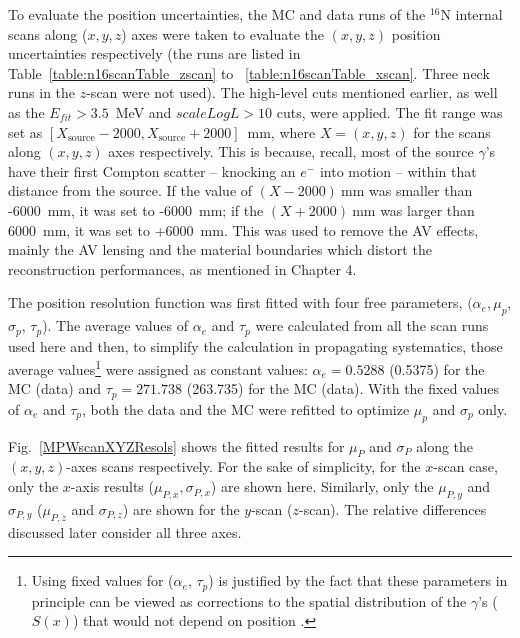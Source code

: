 To evaluate the position uncertainties, the MC and data runs of the $^{16}$N internal scans along ($x, y, z$) axes were taken to evaluate the $(x, y, z)$ position uncertainties respectively (the runs are listed in Table~\ref{table:n16scanTable_zscan} to ~\ref{table:n16scanTable_xscan}. Three neck runs in the $z$-scan were not used). The high-level cuts mentioned earlier, as well as the $E_{fit}>3.5$~MeV and $scaleLogL>10$ cuts, were applied. The fit range was set as $[X_\mathrm{source}-2000, X_\mathrm{source}+2000]$~mm, where $X=(x,y,z)$ for the scans along $(x,y,z)$ axes respectively. This is because, recall, most of the source $\gamma$'s have their first Compton scatter -- knocking an $e^{-}$ into motion -- within that distance from the source. If the value of $(X-2000)~$mm was smaller than -6000~mm, it was set to -6000~mm; if the $(X+2000)~$mm was larger than 6000~mm, it was set to +6000~mm. This was used to remove the AV effects, mainly the AV lensing and the material boundaries which distort the reconstruction performances, as mentioned in Chapter 4.

The position resolution function was first fitted with four free parameters, $(\alpha_e,\mu_p$, $\sigma_p$, $\tau_p$). The average values of $\alpha_e$ and $\tau_p$ were calculated from all the scan runs used here and then, to simplify the calculation in propagating systematics, those average values\footnote{Using fixed values for ($\alpha_e$, $\tau_p$) is justified by the fact that these parameters in principle can be viewed as corrections to the spatial distribution of the $\gamma$'s ($S(x)$) that would not depend on position \cite{waterunidoc}.} were assigned as constant values: $\alpha_e=0.5288$ (0.5375) for the MC (data) and $\tau_p=271.738$ (263.735) for the MC (data). With the fixed values of $\alpha_e$ and $\tau_p$, both the data and the MC were refitted to optimize $\mu_p$ and $\sigma_p$ only. 

Fig.~\ref{MPWscanXYZResols} shows the fitted results for $\mu_P$ and $\sigma_P$ along the $(x, y, z)$-axes scans respectively. For the sake of simplicity, for the $x$-scan case, only the $x$-axis results ($\mu_{P,x},\sigma_{P,x}$) are shown here. Similarly, only the $\mu_{P,y}$ and $\sigma_{P,y}$ ($\mu_{P,z}$ and $\sigma_{P,z}$) are shown for the $y$-scan ($z$-scan). The relative differences discussed later consider all three axes.

